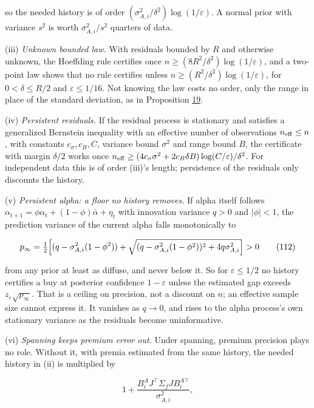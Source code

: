\documentclass[11pt]{article}
\begin{document}
so the needed history is of order \((\sigma_{A,i}^2/\delta^2)\log(1/\varepsilon)\). A
normal prior with variance \(s^2\) is worth \(\sigma_{A,i}^2/s^2\) quarters of data.

(iii) \emph{Unknown bounded law.} With residuals bounded by \(R\) and
otherwise unknown, the Hoeffding rule certifies once
\(n\geq(8R^2/\delta^2)\log(1/\varepsilon)\), and a two-point law shows that no rule
certifies unless \(n\geq(R^2/\delta^2)\log(1/\varepsilon)\), for \(0<\delta\leq R/2\) and
\(\varepsilon\leq1/16\). Not knowing the law costs no
order, only the range in place of the standard deviation, as in
Proposition \hyperref[res:Proposition-19]{19}.

(iv) \emph{Persistent residuals.} If the residual process is stationary and
satisfies a generalized Bernstein inequality with an effective number
of observations \(n_{\rm eff}\leq n\), with constants \(c_\sigma,c_B,C\), variance
bound \(\sigma^2\) and range bound \(B\), the certificate with margin \(\delta/2\)
works once \(n_{\rm eff}\geq(4c_\sigma\sigma^2+2c_B\delta B)\log(C/\varepsilon)/\delta^2\). For
independent data this is of order (iii)'s length; persistence of the
residuals only discounts the history.

(v) \emph{Persistent alpha: a floor no history removes.} If alpha itself
follows \(\alpha_{t+1}=\phi\alpha_t+(1-\phi)\bar\alpha+\eta_t\) with innovation variance
\(q>0\) and \(|\phi|<1\), the prediction variance of the current alpha falls
monotonically to

\begin{equation*}
p_\infty=\tfrac12\Bigl[(q-\sigma_{A,i}^2(1-\phi^2))
 +\sqrt{(q-\sigma_{A,i}^2(1-\phi^2))^2+4q\sigma_{A,i}^2}\Bigr]>0\tag{112}\label{eq:112}
\end{equation*}

from any prior at least as diffuse, and never below it. So for
\(\varepsilon\leq1/2\) no history certifies a buy at posterior confidence \(1-\varepsilon\)
unless the estimated gap exceeds \(z_\varepsilon\sqrt{p_\infty}\). That is a ceiling on
precision, not a discount on \(n\); an effective sample size cannot
express it. It vanishes as \(q\to0\), and rises to the alpha process's
own stationary variance as the residuals become uninformative.

(vi) \emph{Spanning keeps premium error out.} Under spanning, premium
precision plays no role. Without it, with premia estimated from the
same history, the needed history in (ii) is multiplied by

\begin{equation*}
1+\frac{B^A_iJ^\top\Sigma_fJB^{A\top}_i}{\sigma_{A,i}^2},\tag{113}\label{eq:113}
\end{equation*}
\end{document}
